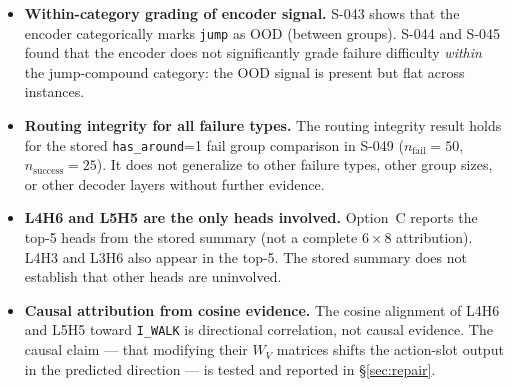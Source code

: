 \begin{itemize}
  \item \textbf{Within-category grading of encoder signal.}
    S-043 shows that the encoder categorically marks \texttt{jump} as OOD (between
    groups). S-044 and S-045 found that the encoder does not significantly grade
    failure difficulty \emph{within} the jump-compound category: the OOD signal is
    present but flat across instances.

  \item \textbf{Routing integrity for all failure types.}
    The routing integrity result holds for the stored \texttt{has\_around}=1 fail group
    comparison in S-049 ($n_\text{fail}=50$, $n_\text{success}=25$).
    It does not generalize to other failure types, other group sizes, or other decoder
    layers without further evidence.

  \item \textbf{L4H6 and L5H5 are the only heads involved.}
    Option~C reports the top-5 heads from the stored summary (not a complete
    $6 \times 8$ attribution). L4H3 and L3H6 also appear in the top-5.
    The stored summary does not establish that other heads are uninvolved.

  \item \textbf{Causal attribution from cosine evidence.}
    The cosine alignment of L4H6 and L5H5 toward \texttt{I\_WALK} is directional
    correlation, not causal evidence. The causal claim --- that modifying their
    $W_V$ matrices shifts the action-slot output in the predicted direction ---
    is tested and reported in \S\ref{sec:repair}.
\end{itemize}
